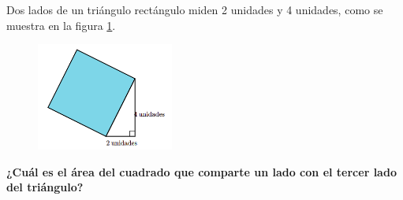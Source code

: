 Dos lados de un triángulo rectángulo miden 2 unidades y 4 unidades, como se muestra en la figura \ref{fig:area10}.
\begin{figure}[H]
    \begin{center}
        \includegraphics[width=0.4\textwidth]{../images/area10.png}
    \end{center}
    \caption{}
    \label{fig:area10}
\end{figure}
\textbf{¿Cuál es el área del cuadrado que comparte un lado con el tercer lado del triángulo?}